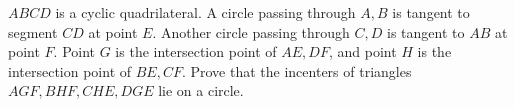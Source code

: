 $ABCD$ is a cyclic quadrilateral. A circle passing through $A,B$ is tangent to segment $CD$ at point $E$. Another circle passing through $C,D$ is tangent to $AB$ at point $F$. Point $G$ is the intersection point of $AE,DF$,  and point $H$ is the intersection point of $BE,CF$. Prove that the incenters of triangles $AGF,BHF,CHE,DGE$ lie on a circle.